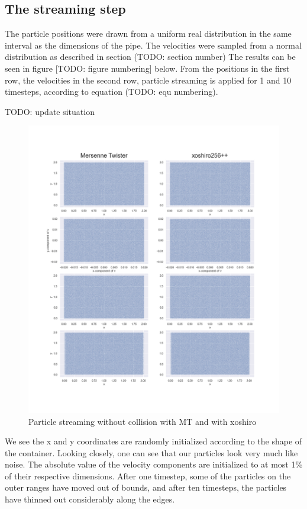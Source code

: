 \documentclass[
]{article}
\begin{document}
\hypertarget{the-streaming-step-2}{%
\subsection{The streaming step}\label{the-streaming-step-2}}

The particle positions were drawn from a uniform real distribution in
the same interval as the dimensions of the pipe. The velocities were
sampled from a normal distribution as described in section (TODO:
section number) The results can be seen in figure {[}TODO: figure
numbering{]} below. From the positions in the first row, the velocities
in the second row, particle streaming is applied for 1 and 10 timesteps,
according to equation (TODO: equ numbering).

TODO: update situation

\begin{figure}
\centering
\includegraphics{Assets/particle_streaming.png}
\caption{Particle streaming without collision with MT and with xoshiro}
\end{figure}

We see the x and y coordinates are randomly initialized according to the
shape of the container. Looking closely, one can see that our particles
look very much like noise. The absolute value of the velocity components
are initialized to at most 1\% of their respective dimensions. After one
timestep, some of the particles on the outer ranges have moved out of
bounds, and after ten timesteps, the particles have thinned out
considerably along the edges.
\end{document}
